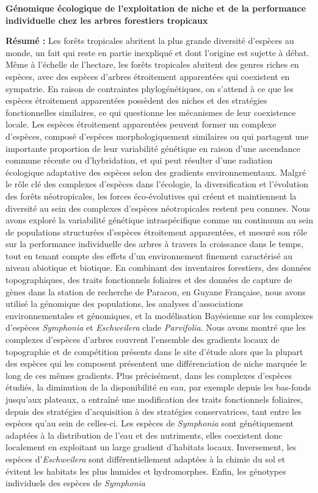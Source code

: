 \documentclass[12pt,twoside,a4paper, a]{article}
\begin{document}
  {\fontsize{7.5}{8}\selectfont
  \begin{center}
  \textbf{Génomique écologique de l'exploitation de niche et de la performance individuelle chez les arbres forestiers tropicaux} \\
  \end{center} 
  \textbf{Résumé :}
  Les forêts tropicales abritent la plus grande diversité d'espèces au monde, un fait qui reste en partie inexpliqué et dont l'origine est sujette à débat. Même à l'échelle de l'hectare, les forêts tropicales abritent des genres riches en espèces, avec des espèces d’arbres étroitement apparentées qui coexistent en sympatrie. En raison de contraintes phylogénétiques, on s'attend à ce que les espèces étroitement apparentées possèdent des niches et des stratégies fonctionnelles similaires, ce qui questionne les mécanismes de leur coexistence locale. Les espèces étroitement apparentées peuvent former un complexe d'espèces, composé d’espèces morphologiquement similaires ou qui partagent une importante proportion de leur variabilité génétique en raison d'une ascendance commune récente ou d'hybridation, et qui peut résulter d'une radiation écologique adaptative des espèces selon des gradients environnementaux. Malgré le rôle clé des complexes d'espèces dans l'écologie, la diversification et l'évolution des forêts néotropicales, les forces éco-évolutives qui créent et maintiennent la diversité au sein des complexes d'espèces néotropicales restent peu connues. Nous avons exploré la variabilité génétique intraspécifique comme un continuum au sein de populations structurées d'espèces étroitement apparentées, et mesuré son rôle sur la performance individuelle des arbres à travers la croissance dans le temps, tout en tenant compte des effets d'un environnement finement caractérisé au niveau abiotique et biotique. En combinant des inventaires forestiers, des données topographiques, des traits fonctionnels foliaires et des données de capture de gènes dans la station de recherche de Paracou, en Guyane Française, nous avons utilisé la génomique des populations, les analyses d'associations environnementales et génomiques, et la modélisation Bayésienne sur les complexes d'espèces \emph{Symphonia} et \emph{Eschweilera} clade \emph{Parvifolia}. Nous avons montré que les complexes d'espèces d'arbres couvrent l’ensemble des gradients locaux de topographie et de compétition présents dans le site d'étude alors que la plupart des espèces qui les composent présentent une différenciation de niche marquée le long de ces mêmes gradients. Plus précisément, dans les complexes d'espèces étudiés, la diminution de la disponibilité en eau, par exemple depuis les bas-fonds jusqu’aux plateaux, a entraîné une modification des traits fonctionnels foliaires, depuis des stratégies d'acquisition à des stratégies conservatrices, tant entre les espèces qu'au sein de celles-ci. Les espèces de \emph{Symphonia} sont génétiquement adaptées à la distribution de l'eau et des nutriments, elles coexistent donc localement en exploitant un large gradient d'habitats locaux. Inversement, les espèces d'\emph{Eschweilera} sont différentiellement adaptées à la chimie du sol et évitent les habitats les plus humides et hydromorphes. Enfin, les génotypes individuels des espèces de \emph{Symphonia} }
\end{document}
